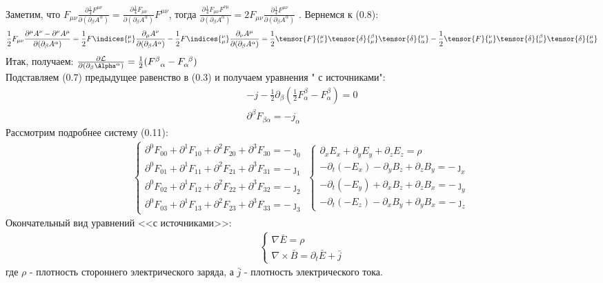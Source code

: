 Заметим, что 
$F_{\mu\nu}\frac{\partial\frac{1}{4}F^{\mu\nu}}{\partial(\partial_\beta A^\alpha)}=\frac{\partial\frac{1}{4}F_{\mu\nu}}{\partial(\partial_\beta A^\alpha)}F^{\mu\nu}$, тогда $\frac{\partial\frac{1}{4}F_{\mu\nu}F^{\nu\mu}}{\partial(\partial_\beta A^\alpha)}=2F_{\mu\nu}\frac{\partial\frac{1}{4}F^{\mu\nu}}{\partial(\partial_\beta A^\alpha)}$
. Вернемся к (0.8):\\
\begin{gather}
\frac{1}{2}F_{\mu\nu}\frac{\partial^\mu A^\nu-\partial^\nu A^\mu}{{\partial(\partial_\beta A^\alpha)}}=
\frac{1}{2}F\indices{^{\mu}_\nu}\frac{\partial_\mu A^\nu}{{\partial(\partial_\beta A^\alpha)}}-\frac{1}{2}F\indices{^{\nu}_\mu}\frac{\partial_\nu A^\mu}{{\partial(\partial_\beta A^\alpha)}}=
\frac{1}{2}\tensor{F}{^{\mu}_\nu}\tensor{\delta}{^{\beta}_\mu}\tensor{\delta}{^{\nu}_\alpha}-\frac{1}{2}\tensor{F}{^{\nu}_\mu}\tensor{\delta}{^{\beta}_\nu}\tensor{\delta}{^{\mu}_\alpha}
\end{gather}
Итак, получаем:
$\frac{\partial \mathcal{L}}{\partial(\partial_\beta\Alpha^\alpha)}=
\frac{1}{2}(F^\beta_{\ \ \alpha}-F_\alpha^{\ \beta})$
\\
Подставляем (0.7) предыдущее равенство в (0.3) и получаем уравнения " с источниками":\\
\begin{gather}
-j-\frac{1}{2}\partial_\beta(\frac{1}{2}F^\beta_\alpha-F_\alpha^\beta)=0\\
\partial^\beta F_{\beta\alpha}=-j_\alpha
\end{gather}
Рассмотрим подробнее систему (0.11):\\
\begin{gather}
	\begin{cases}
	\partial^0F_{00}+\partial^1F_{10}+\partial^2F_{20}+\partial^3F_{30}=-\jmath_0\\
	\partial^0F_{01}+\partial^1F_{11}+\partial^2F_{21}+\partial^3F_{31}=-\jmath_1\\
	\partial^0F_{02}+\partial^1F_{12}+\partial^2F_{22}+\partial^3F_{32}=-\jmath_2\\
	\partial^0F_{03}+\partial^1F_{13}+\partial^2F_{23}+\partial^3F_{33}=-\jmath_3
	\end{cases}
\begin{cases}
	\partial_xE_x+\partial_yE_y+\partial_zE_z=\rho\\
	-\partial_t(-E_x)-\partial_yB_z+\partial_zB_y=-\jmath_x\\
	-\partial_t(-E_y)+\partial_xB_z+\partial_zB_x=-\jmath_y\\
	-\partial_t(-E_z)-\partial_xB_y+\partial_yB_x=-\jmath_z
\end{cases}
\end{gather}
Окончательный вид уравнений <<с источниками>>:\\
\begin{gather}
	\begin{cases}
		\nabla\bar{E}=\rho\\
		\nabla\times\bar{B}=\partial_t\bar{E}+\bar{j}
	\end{cases}
	\end{gather}
где $\rho$ - плотность стороннего электрического заряда, а $\bar{j}$ - плотность электрического тока.
